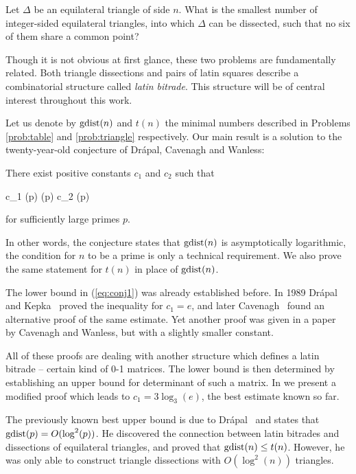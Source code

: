 \begin{prob-intro}
\label{prob:triangle}
Let $\Delta$ be an equilateral triangle of side $n$. What is the smallest number of integer-sided equilateral triangles, into which $\Delta$ can be dissected, such that no six of them share a common point?
\end{prob-intro}


Though it is not obvious at first glance, these two problems are fundamentally related. Both triangle dissections and pairs of latin squares describe a combinatorial structure called \emph{latin bitrade}. This structure will be of central interest throughout this work.

Let us denote by $\mathop{\mathrm{gdist}}(n)$ and $t(n)$ the minimal numbers described in Problems \ref{prob:table} and \ref{prob:triangle} respectively. Our main result is a solution to the twenty-year-old conjecture of Drápal, Cavenagh and Wanless:

\begin{conj-intro}
\label{conj:main}
There exist positive constants $c_1$ and $c_2$ such that
\begin{cosyeqnarray}
	c_1 \log(p) \leq \gdist(p) \leq c_2 \log(p) \label{eq:conj1}
\end{cosyeqnarray}
for sufficiently large primes $p$.
\end{conj-intro}

In other words, the conjecture states that $\mathop{\mathrm{gdist}}(n)$ is asymptotically logarithmic, the condition for $n$ to be a prime is only a technical requirement. We also prove the same statement for $t(n)$ in place of $\mathop{\mathrm{gdist}}(n)$.

The lower bound in (\ref{eq:conj1}) was already established before. In 1989 Drápal and Kepka~\cite{DrapalKepka89} proved the inequality for $c_1 = e$, and later Cavenagh~\cite{Cavenagh03} found an alternative proof of the same estimate. Yet another proof was given in a paper~\cite{CavenaghWanless09} by Cavenagh and Wanless, but with a slightly smaller constant.

All of these proofs are dealing with another structure which defines a latin bitrade -- certain kind of 0-1 matrices. The lower bound is then determined by establishing an upper bound for determinant of such a matrix. In  we present a modified proof which leads to $c_1 = 3 \log_3(e)$, the best estimate known so far.

\bigskip

The previously known best upper bound is due to Drápal~\cite{Drapal91} and states that $\mathop{\mathrm{gdist}}(p) = O(\log^2(p))$. He discovered the connection between latin bitrades and dissections of equilateral triangles, and proved that $\mathop{\mathrm{gdist}}(n) \leq t(n)$. However, he was only able to construct triangle dissections with $O(\log^2(n))$ triangles.

